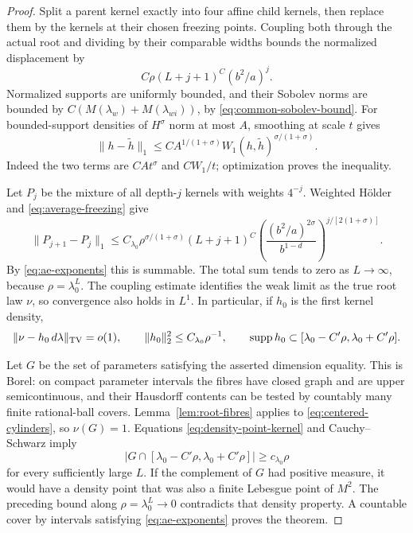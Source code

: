 \documentclass[11pt,a4paper]{amsart}
\numberwithin{equation}{section}
\theoremstyle{definition}
\begin{document}
\begin{proof}
Split a parent kernel exactly into four affine child kernels,
then replace them by the kernels at their chosen freezing points.
Coupling both through the actual root and dividing by their
comparable widths bounds the normalized displacement by
\[
C\rho(L+j+1)^C(b^2/a)^j.
\]
Normalized supports are uniformly bounded, and their Sobolev
norms are bounded by
\(C(M(\lambda_w)+M(\lambda_{wi}))\), by
\eqref{eq:common-sobolev-bound}.
For bounded-support densities of \(H^\sigma\) norm at most \(A\),
smoothing at scale \(t\) gives
\[
\|h-\widetilde h\|_1
\leq C A^{1/(1+\sigma)}
W_1(h,\widetilde h)^{\sigma/(1+\sigma)}.
\]
Indeed the two terms are \(CAt^\sigma\) and \(CW_1/t\);
optimization proves the inequality.

Let \(P_j\) be the mixture of all depth-\(j\) kernels with
weights \(4^{-j}\). Weighted Hölder and
\eqref{eq:average-freezing} give
\begin{equation}
\|P_{j+1}-P_j\|_1
\leq C_{\lambda_0}\rho^{\sigma/(1+\sigma)}(L+j+1)^C
\left(\frac{(b^2/a)^{2\sigma}}{b^{1-d}}\right)^{j/[2(1+\sigma)]}.
\label{eq:ae-summable}
\end{equation}
By \eqref{eq:ae-exponents} this is summable. The total sum tends
to zero as \(L\to\infty\), because \(\rho=\lambda_0^L\).
The coupling estimate identifies the weak limit as the true
root law \(\nu\), so convergence also holds in \(L^1\).
In particular, if \(h_0\) is the first kernel density,
\begin{equation}
\|\nu-h_0\,d\lambda\|_{\rm TV}=o(1),\qquad
\|h_0\|_2^2\leq C_{\lambda_0}\rho^{-1},\qquad
\operatorname{supp}h_0\subset
[\lambda_0-C'\rho,\lambda_0+C'\rho].
\label{eq:density-point-kernel}
\end{equation}

Let \(G\) be the set of parameters satisfying the asserted
dimension equality. This is Borel: on compact parameter
intervals the fibres have closed graph and are upper
semicontinuous, and their Hausdorff contents can be tested by
countably many finite rational-ball covers.
Lemma~\ref{lem:root-fibres} applies to
\eqref{eq:centered-cylinders}, so \(\nu(G)=1\).
Equations \eqref{eq:density-point-kernel} and Cauchy--Schwarz imply
\[
|G\cap[\lambda_0-C'\rho,\lambda_0+C'\rho]|
\geq c_{\lambda_0}\rho
\]
for every sufficiently large \(L\).
If the complement of \(G\) had positive measure, it would have
a density point that was also a finite Lebesgue point of \(M^2\).
The preceding bound along \(\rho=\lambda_0^L\to0\) contradicts
that density property.
A countable cover by intervals satisfying \eqref{eq:ae-exponents}
proves the theorem.
\end{proof}
\end{document}
